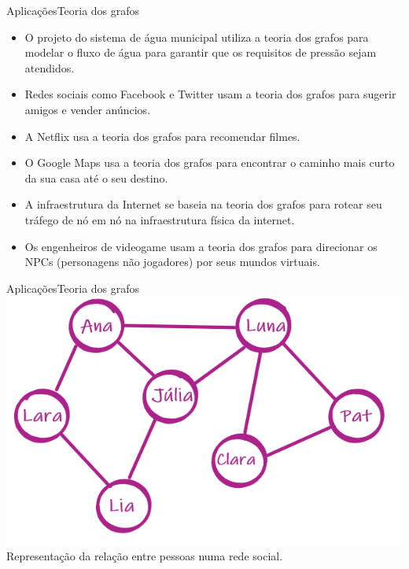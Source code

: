 \documentclass[t]{beamer}
\begin{document}
\begin{ftst}{Aplicações}{Teoria dos grafos}
\justifying
\begin{itemize}
    \item O projeto do sistema de água municipal utiliza a teoria dos grafos para modelar o fluxo de água para garantir que os requisitos de pressão sejam atendidos.
    \item Redes sociais como Facebook e Twitter usam a teoria dos grafos para sugerir amigos e vender anúncios.
    \item A Netflix usa a teoria dos grafos para recomendar filmes.
    \item O Google Maps usa a teoria dos grafos para encontrar o caminho mais curto da sua casa até o seu destino.
    \item A infraestrutura da Internet se baseia na teoria dos grafos para rotear seu tráfego de nó em nó na infraestrutura física da internet.
    \item Os engenheiros de videogame usam a teoria dos grafos para direcionar os NPCs (personagens não jogadores) por seus mundos virtuais.
\end{itemize}

\end{ftst}


\begin{ftst}{Aplicações}{Teoria dos grafos}
\vone
\vone
\centering
\includegraphics[scale=0.5]{Figuras/redes.png}\\
\vone
\vone
Representação da relação entre pessoas numa rede social.

\end{ftst}

\end{document}
